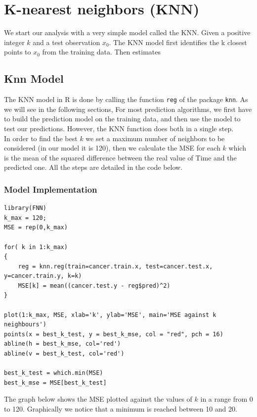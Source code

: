 \documentclass[]{report}
\begin{document}
\section{K-nearest neighbors (KNN)}
We start our analysis with a very simple model called the KNN.
Given a positive integer $k$ and a test observation $x_0$. The KNN model first identifies the k closest points to $x_0$ from the training data. Then estimates \\ 

\subsection{Knn Model}
The KNN model in R is done by calling the function \texttt{reg} of the package \texttt{knn}. As we will see in the following sections, For most prediction algorithms, we first have to build the prediction model on the training data, and then use the model to test our predictions. However, the KNN function does both in a single step.\\ 
In order to find the best $k$ we set a maximum number of neighbors to be considered (in our model it is 120), then we calculate the MSE for each $k$ which is the mean of the squared difference between the real value of Time and the predicted one. All the steps are detailed in the code below.

\subsubsection{Model Implementation}
\begin{lstlisting}
library(FNN)
k_max = 120;
MSE = rep(0,k_max)

for( k in 1:k_max)
{
	reg = knn.reg(train=cancer.train.x, test=cancer.test.x, y=cancer.train.y, k=k)
	MSE[k] = mean((cancer.test.y - reg$pred)^2)
}

plot(1:k_max, MSE, xlab='k', ylab='MSE', main='MSE against k neighbours')
points(x = best_k_test, y = best_k_mse, col = "red", pch = 16)
abline(h = best_k_mse, col='red')
abline(v = best_k_test, col='red')

best_k_test = which.min(MSE)
best_k_mse = MSE[best_k_test]
\end{lstlisting}

The graph below shows the MSE plotted against the values of $k$ in a range from 0 to 120. Graphically we notice that a minimum is reached between 10 and 20.
\end{document}
